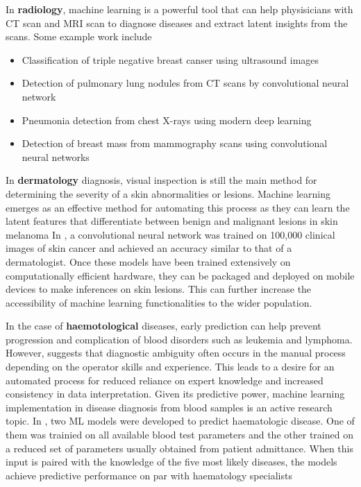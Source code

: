 \documentclass{article}
\begin{document}
In \textbf{radiology}, machine learning is a powerful tool that can help physisicians with CT scan and MRI scan to diagnose diseases and extract latent insights from the scans. Some example work include
\begin{itemize}
    \item Classification of triple negative breast canser using ultrasound images \cite{wu_machine_2019}
    \item Detection of pulmonary lung nodules from CT scans by convolutional neural network \cite{van_ginneken_off--shelf_2015}
    \item Pneumonia detection from chest X-rays using modern deep learning \cite{rajpurkar_chexnet_2017}
    \item Detection of breast mass from mammography scans using convolutional neural networks \cite{arevalo_convolutional_2015}
\end{itemize} 

In \textbf{dermatology} diagnosis, visual inspection is still the main method for determining the severity of a skin abnormalities or lesions. 
Machine learning emerges as an effective method for automating this process as they can learn the latent features that differentiate between benign and malignant lesions in skin melanoma
In \cite{esteva_dermatologist-level_2017}, a convolutional neural network was trained on 100,000 clinical images of skin cancer and achieved an accuracy similar to that of a dermatologist.
Once these models have been trained extensively on computationally efficient hardware, they can be packaged and deployed on mobile devices to make inferences on skin lesions. 
This can further increase the accessibility of machine learning functionalities to the wider population.

In the case of \textbf{haemotological} diseases, early prediction can help prevent progression and complication of blood disorders such as leukemia and lymphoma. 
However, \cite{walter_artificial_2023} suggests that diagnostic ambiguity often occurs in the manual process depending on the operator skills and experience.
This leads to a desire for an automated process for reduced reliance on expert knowledge and increased consistency in data interpretation.
Given its predictive power, machine learning implementation in disease diagnosis from blood samples is an active research topic. 
In \cite{guncar_application_2018}, two ML models were developed to predict haematologic disease.
One of them was trainied on all available blood test parameters and the other trained on a reduced set of parameters usually obtained from patient admittance.
When this input is paired with the knowledge of the five most likely diseases, the models achieve predictive performance on par with haematology specialists
\end{document}
